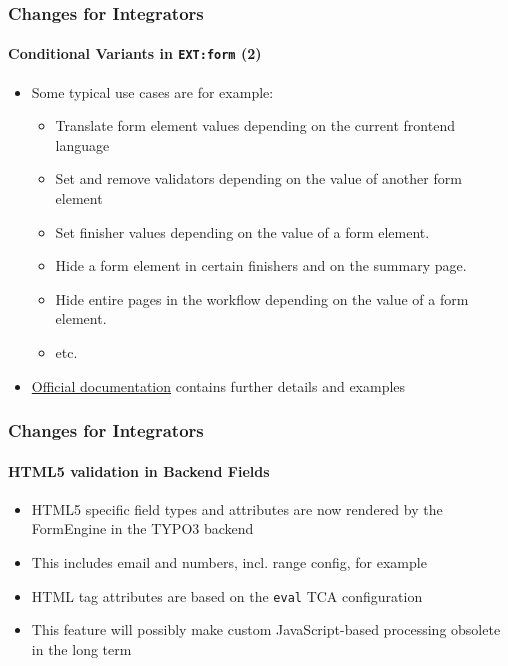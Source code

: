 \begin{frame}[fragile]
	\frametitle{Changes for Integrators}
	\framesubtitle{Conditional Variants in \texttt{EXT:form} (2)}

	\begin{itemize}
		\item Some typical use cases are for example:

			\begin{itemize}
				\item Translate form element values depending on the current
					frontend language
				\item Set and remove validators depending on the value of
					another form element
				\item Set finisher values depending on the value of a form element.
				\item Hide a form element in certain finishers and on the summary page.
				\item Hide entire pages in the workflow depending on the value of a
					form element.
				\item etc.
			\end{itemize}

		\item \href{https://docs.typo3.org/typo3cms/extensions/form}{Official documentation}
			contains further details and examples

	\end{itemize}

\end{frame}


\begin{frame}[fragile]
	\frametitle{Changes for Integrators}
	\framesubtitle{HTML5 validation in Backend Fields}

	\begin{itemize}
		\item HTML5 specific field types and attributes are now rendered by
			the FormEngine in the TYPO3 backend
		\item This includes email and numbers, incl. range config, for example
		\item HTML tag attributes are based on the \texttt{eval} TCA configuration
		\item This feature will possibly make custom JavaScript-based processing
			obsolete in the long term
	\end{itemize}

\end{frame}

